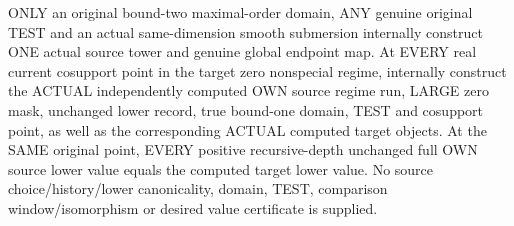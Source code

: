 \begin{theorem}
\label{hir:original-only-zero-own-curve-full-values}
\leanok
ONLY an original bound-two maximal-order domain, ANY genuine original
TEST and an actual same-dimension smooth submersion internally construct
ONE actual source tower and genuine global endpoint map. At EVERY real
current cosupport point in the target zero nonspecial regime, internally
construct the ACTUAL independently computed OWN source regime run,
LARGE zero mask, unchanged lower record, true bound-one domain, TEST and
cosupport point, as well as the corresponding ACTUAL computed target
objects. At the SAME original point, EVERY positive recursive-depth
unchanged full OWN source lower value equals the computed target lower
value. No source choice/history/lower canonicality, domain, TEST,
comparison window/isomorphism or desired value certificate is supplied.
\end{theorem}
